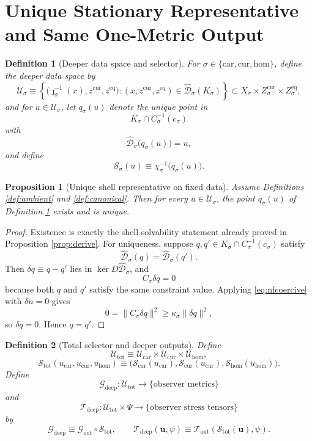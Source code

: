 \documentclass[11pt]{article}
\newcommand{\Car}{\mathrm{car}}
\newcommand{\Cur}{\mathrm{cur}}
\newcommand{\Hom}{\mathrm{hom}}
\newcommand{\MetricOut}{\mathscr G_{\mathrm{out}}}
\newcommand{\MatterOut}{\mathscr T_{\mathrm{out}}}
\newcommand{\DeepMetricOut}{\mathscr G_{\mathrm{deep}}}
\newcommand{\DeepMatterOut}{\mathscr T_{\mathrm{deep}}}
\newcommand{\CoordBody}[1]{K_{#1}}
\newcommand{\AffineData}[1]{\widehat{\mathcal D}_{#1}}
\newcommand{\ConstraintMap}[1]{C_{#1}}
\newcommand{\ConstraintValue}[1]{c_{#1}}
\newcommand{\ShellChart}[1]{\chi_{#1}}
\newcommand{\DeepSpace}[1]{\mathcal U_{#1}}
\newcommand{\ChainSelect}[1]{\mathcal S_{#1}}
\newcommand{\DeepShell}{\mathcal U_{\mathrm{tot}}}
\newcommand{\ChainSelectTriple}{\mathcal S_{\mathrm{tot}}}
\newtheorem{definition}{Definition}
\newtheorem{proposition}{Proposition}
\begin{document}
\section{Unique Stationary Representative and Same One-Metric Output}

\begin{definition}[Deeper data space and selector]
\label{def:selector}
For \(\sigma\in\{\Car,\Cur,\Hom\}\), define the deeper data space by
\[
\DeepSpace{\sigma}
\equiv
\left\{
\bigl(
\jmath_{\sigma}^{-1}(x),z^{\mathrm{cur}},z^{\mathrm{eq}}
\bigr):
(x,z^{\mathrm{cur}},z^{\mathrm{eq}})
\in
\AffineData{\sigma}(\CoordBody{\sigma})
\right\}
\subset
X_{\sigma}\times Z_{\sigma}^{\mathrm{cur}}\times Z_{\sigma}^{\mathrm{eq}},
\]
and for \(u\in\DeepSpace{\sigma}\), let \(q_{\sigma}(u)\) denote the unique point in
\[
\CoordBody{\sigma}\cap \ConstraintMap{\sigma}^{-1}(\ConstraintValue{\sigma})
\]
with
\[
\AffineData{\sigma}\bigl(q_{\sigma}(u)\bigr)=u,
\]
and define
\begin{equation}
\ChainSelect{\sigma}(u)
\equiv
\ShellChart{\sigma}^{-1}\bigl(q_{\sigma}(u)\bigr).
\label{eq:selectordef}
\end{equation}
\end{definition}

\begin{proposition}[Unique shell representative on fixed data]
\label{prop:selector}
Assume Definitions \ref{def:ambient} and \ref{def:canonical}. Then for every \(u\in\DeepSpace{\sigma}\), the point \(q_{\sigma}(u)\) of Definition \ref{def:selector} exists and is unique.
\end{proposition}

\begin{proof}
Existence is exactly the shell solvability statement already proved in Proposition \ref{prop:derive}. For uniqueness, suppose \(q,q'\in \CoordBody{\sigma}\cap \ConstraintMap{\sigma}^{-1}(\ConstraintValue{\sigma})\) satisfy
\[
\AffineData{\sigma}(q)=\AffineData{\sigma}(q').
\]
Then \(\delta q\equiv q-q'\) lies in \(\ker D\AffineData{\sigma}\), and
\[
\ConstraintMap{\sigma}\delta q=0
\]
because both \(q\) and \(q'\) satisfy the same constraint value. Applying \eqref{eq:nfcoercive} with \(\delta n=0\) gives
\[
0
=
\|\ConstraintMap{\sigma}\delta q\|^{2}
\ge
\kappa_{\sigma}\|\delta q\|^{2},
\]
so \(\delta q=0\). Hence \(q=q'\).
\end{proof}

\begin{definition}[Total selector and deeper outputs]
\label{def:deepoutputs}
Define
\[
\DeepShell
\equiv
\DeepSpace{\Car}\times\DeepSpace{\Cur}\times\DeepSpace{\Hom},
\]
\[
\ChainSelectTriple(u_{\Car},u_{\Cur},u_{\Hom})
\equiv
\bigl(
\ChainSelect{\Car}(u_{\Car}),
\ChainSelect{\Cur}(u_{\Cur}),
\ChainSelect{\Hom}(u_{\Hom})
\bigr).
\]
Define
\[
\DeepMetricOut:\DeepShell\to\{\text{observer metrics}\}
\]
and
\[
\DeepMatterOut:\DeepShell\times\Psi\to\{\text{observer stress tensors}\}
\]
by
\begin{equation}
\DeepMetricOut
\equiv
\MetricOut\circ\ChainSelectTriple,
\qquad
\DeepMatterOut(\mathbf u,\psi)
\equiv
\MatterOut(\ChainSelectTriple(\mathbf u),\psi).
\label{eq:deepoutputs}
\end{equation}
\end{definition}
\end{document}
